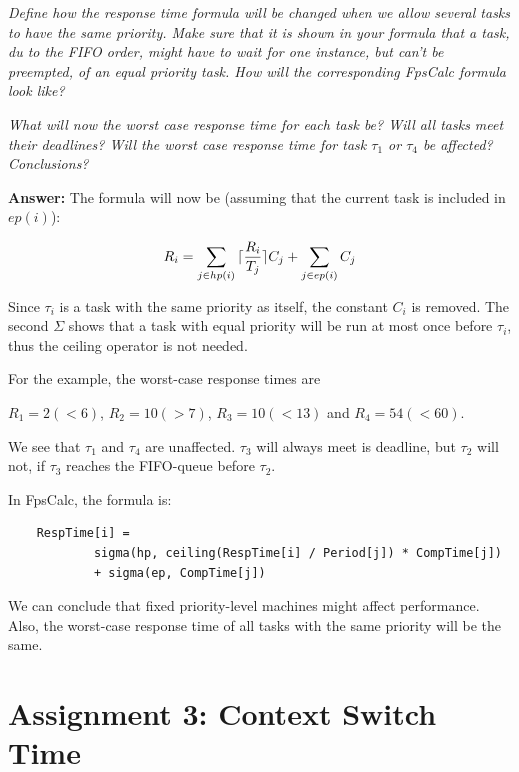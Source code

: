 \documentclass[a4paper,10pt]{article}
\DeclarePairedDelimiter{\ceil}{\lceil}{\rceil}
\newcommand{\answer}{\textbf{Answer: }}
\begin{document}
\begin{enumerate}
	\emph{Define how the response time formula will be changed when we allow several tasks to have the same priority. Make sure that it is shown in your formula that a task, du to the FIFO order, might have to wait for one instance, but can't be preempted, of an equal priority task. How will the corresponding FpsCalc formula look like?}
	
	\emph{What will now the worst case response time for each task be? Will all tasks meet their deadlines? Will the worst case response time for task $\tau_1$ or $\tau_4$ be affected? Conclusions?}
	
	\answer The formula will now be (assuming that the current task is included in $ep(i)$):
	
	\begin{equation*}
		R_i = \sum_{j \in hp(i)}{\ceil{\frac{R_i}{T_j}}C_j} + \sum_{j \in ep(i)}{C_j}
	\end{equation*}
	
	Since $\tau_i$ is a task with the same priority as itself, the constant $C_i$ is removed. The second $\Sigma$ shows that a task with equal priority will be run at most once before $\tau_i$, thus the ceiling operator is not needed.
	
	For the example, the worst-case response times are
	
	$R_1 = 2 (< 6)$, $R_2 = 10 (> 7)$, $R_3 = 10 (< 13)$ and $R_4 = 54 (< 60)$.
	
	We see that $\tau_1$ and $\tau_4$ are unaffected. $\tau_3$ will always meet is deadline, but $\tau_2$ will not, if $\tau_3$ reaches the FIFO-queue before $\tau_2$.
	
	In FpsCalc, the formula is:
	
	\begin{lstlisting}
	RespTime[i] =
			sigma(hp, ceiling(RespTime[i] / Period[j]) * CompTime[j])
			+ sigma(ep, CompTime[j])
	\end{lstlisting}
	
	We can conclude that fixed priority-level machines might affect performance. Also, the worst-case response time of all tasks with the same priority will be the same.
	
\end{enumerate}

\section{Assignment 3: Context Switch Time}
\end{document}
